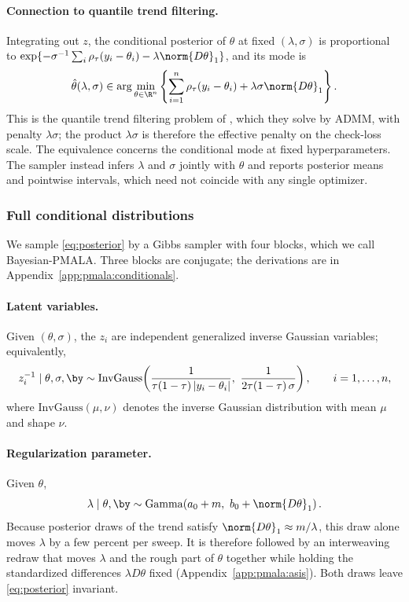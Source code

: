 \paragraph{Connection to quantile trend filtering.} Integrating out $z$, the conditional posterior of $\theta$ at fixed $(\lambda, \sigma)$ is proportional to $\exp\{-\sigma^{-1}\sum_i \rho_\tau(y_i-\theta_i) - \lambda\norm{D\theta}_1\}$, and its mode is
\begin{equation}
    \hat{\theta}(\lambda, \sigma) \in \arg\min_{\theta \in \R^n} \left\{ \sum_{i=1}^n \rho_\tau(y_i-\theta_i) + \lambda\sigma \norm{D\theta}_1 \right\}.
    \label{eq:map_qtf}
\end{equation}
This is the quantile trend filtering problem of \citet{brantley2020baseline}, which they solve by ADMM, with penalty $\lambda\sigma$; the product $\lambda\sigma$ is therefore the effective penalty on the check-loss scale. The equivalence concerns the conditional mode at fixed hyperparameters. The sampler instead infers $\lambda$ and $\sigma$ jointly with $\theta$ and reports posterior means and pointwise intervals, which need not coincide with any single optimizer.

\subsubsection{Full conditional distributions}

We sample \eqref{eq:posterior} by a Gibbs sampler with four blocks, which we call Bayesian-PMALA. Three blocks are conjugate; the derivations are in Appendix~\ref{app:pmala:conditionals}.

\paragraph{Latent variables.} Given $(\theta, \sigma)$, the $z_i$ are independent generalized inverse Gaussian variables; equivalently,
\begin{equation}
    z_i^{-1} \mid \theta, \sigma, \by \sim \mathrm{InvGauss}\!\left(\frac{1}{\tau(1-\tau)\,|y_i - \theta_i|},\ \frac{1}{2\tau(1-\tau)\,\sigma}\right), \qquad i = 1, \ldots, n,
    \label{eq:zupdate}
\end{equation}
where $\mathrm{InvGauss}(\mu, \nu)$ denotes the inverse Gaussian distribution with mean $\mu$ and shape $\nu$.

\paragraph{Regularization parameter.} Given $\theta$,
\begin{equation}
    \lambda \mid \theta, \by \sim \mathrm{Gamma}\!\left(a_0 + m,\ b_0 + \norm{D\theta}_1\right).
    \label{eq:lambdaupdate}
\end{equation}
Because posterior draws of the trend satisfy $\norm{D\theta}_1 \approx m/\lambda$, this draw alone moves $\lambda$ by a few percent per sweep. It is therefore followed by an interweaving redraw \citep{yu2011center} that moves $\lambda$ and the rough part of $\theta$ together while holding the standardized differences $\lambda D\theta$ fixed (Appendix~\ref{app:pmala:asis}). Both draws leave \eqref{eq:posterior} invariant.

